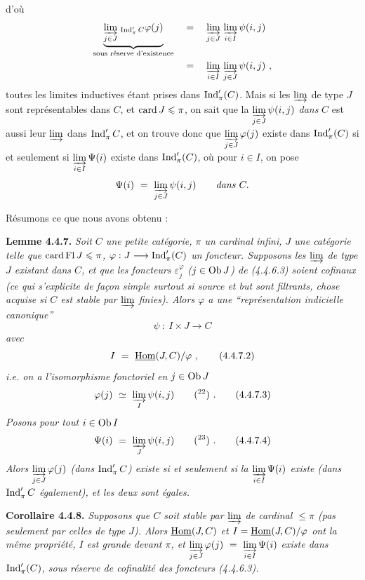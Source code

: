 d'où
\[
\begin{aligned}
\underbrace{\varinjlim_{j\in J}{}_{\,\operatorname{Ind}'_\pi C}\varphi(j)}_{\text{sous réserve d'existence}} \quad &= \quad \varinjlim_{j\in J}\, \varinjlim_{i\in I} \psi(i,j)\\
&= \quad \varinjlim_{i\in I}\, \varinjlim_{j\in J} \psi(i,j)\ ,
\end{aligned}
\]
toutes les limites inductives étant prises dans $\operatorname{Ind}'_\pi(C)$. Mais si les $\varinjlim$ de type $J$ sont représentables dans $C$, et $\operatorname{card} J \leqslant \pi$, on sait que la $\varinjlim\limits_{j\in J} \psi(i,j)$ \textit{dans} $C$ est aussi leur $\varinjlim$ dans $\operatorname{Ind}'_\pi C$, et on trouve donc que $\varinjlim\limits_{j\in J} \varphi(j)$ existe dans $\operatorname{Ind}'_\pi(C)$ si et seulement si $\varinjlim\limits_{i\in I} \Psi(i)$ existe dans $\operatorname{Ind}'_\pi(C)$, où pour $i \in I$, on pose
\[
\Psi(i) \ =\ \varinjlim_{j\in J} \psi(i,j) \qquad \textit{dans } C.
\]

Résumons ce que nous avons obtenu :

\textbf{Lemme 4.4.7.} \textit{Soit $C$ une petite catégorie, $\pi$ un cardinal infini, $J$ une catégorie telle que $\operatorname{card} \operatorname{Fl} J \leqslant \pi$, $\varphi : J \longrightarrow \operatorname{Ind}'_\pi(C)$ un foncteur. Supposons les $\varinjlim$ de type $J$ existant dans $C$, et que les foncteurs $\varepsilon_j^\varphi$ ($j \in \mathrm{Ob}\, J$) de (4.4.6.3) soient \textup{cofinaux} (ce qui s'explicite de façon simple surtout si source et but sont filtrants, chose acquise si $C$ est stable par $\varinjlim$ finies). Alors $\varphi$ a une “représentation indicielle canonique”}
\[
\psi \ :\ I \times J \longrightarrow C \tag*{(4.4.7.1)}
\]
\textit{avec}
\[
I \ =\ \underline{\mathrm{Hom}}(J,C)/\varphi\ , \tag*{(4.4.7.2)}
\]
\textit{i.e. on a l'isomorphisme fonctoriel en $j \in \mathrm{Ob}\, J$}
\[
\varphi(j) \ \simeq\ \varinjlim_{I} \psi(i,j) \qquad (\text{\footnotemark[22]})\ . \tag*{(4.4.7.3)}
\]
\textit{Posons pour tout $i \in \mathrm{Ob}\, I$}
\[
\Psi(i) \ =\ \varinjlim_{J} \psi(i,j) \qquad (\text{\footnotemark[23]})\ . \tag*{(4.4.7.4)}
\]
\textit{Alors $\varinjlim\limits_{j\in J} \varphi(j)$ (dans $\operatorname{Ind}'_\pi C$) existe si et seulement si}
\textit{la $\varinjlim\limits_{i\in I} \Psi(i)$ existe (dans $\operatorname{Ind}'_\pi C$ également), et les deux sont égales.}

\textbf{Corollaire 4.4.8.} \textit{Supposons que $C$ soit stable par $\varinjlim$ de cardinal $\leqslant \pi$ (pas seulement par celles de type $J$). Alors $\underline{\mathrm{Hom}}(J,C)$ et $I = \underline{\mathrm{Hom}}(J,C)/\varphi$ ont la même propriété, $I$ est grande devant $\pi$, et $\varinjlim\limits_{j\in J} \varphi(j) \ =\ \varinjlim\limits_{i\in I} \Psi(i)$ existe dans $\operatorname{Ind}'_\pi(C)$, sous réserve de cofinalité des foncteurs (4.4.6.3).}

